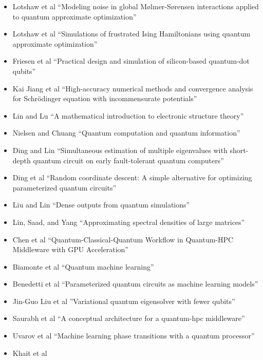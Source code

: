 \documentclass[]{article}
\begin{document}
\begin{itemize}
\item
Lotshaw et al\cite{PhysRevA.107.062406}
``Modeling noise in global M\o{}lmer-S\o{}rensen interactions applied to quantum approximate optimization''
\item
Lotshaw et al\cite{doi:10.1098/rsta.2021.0414}
``Simulations of frustrated Ising Hamiltonians using quantum approximate optimization''
\item Friesen et al\cite{PhysRevB.67.121301}
  ``Practical design and simulation of silicon-based quantum-dot qubits''
\item Kai Jiang et al\cite{jiang2024high}
``High-accuracy numerical methods and convergence analysis for Schr{\"o}dinger equation with incommensurate potentials''
\item Lin and Lu\cite{lin2019mathematical}
``A mathematical introduction to electronic structure theory''
\item Nielsen and Chuang\cite{nielsen2010quantum}
``Quantum computation and quantum information''
\item Ding and Lin\cite{ding2023simultaneous}
``Simultaneous estimation of multiple eigenvalues with short-depth quantum circuit on early fault-tolerant quantum computers''
\item Ding et al\cite{ding2024random}
  ``Random coordinate descent: A simple alternative for optimizing parameterized quantum circuits''
\item Liu and Lin\cite{LIU2024113213}
``Dense outputs from quantum simulations''
\item Lin, Saad, and Yang\cite{lin2016approximating}
``Approximating spectral densities of large matrices''
\item Chen et al\cite{10628380}
``Quantum-Classical-Quantum Workflow in Quantum-HPC Middleware with GPU Acceleration''
\item Biamonte et al\cite{biamonte2017quantum}
``Quantum machine learning''
\item Benedetti et al\cite{Benedetti_2019}
``Parameterized quantum circuits as machine learning models''
\item Jin-Guo Liu et al\cite{PhysRevResearch.1.023025}
''Variational quantum eigensolver with fewer qubits''
\item Saurabh et al\cite{saurabh2023conceptual}
``A conceptual architecture for a quantum-hpc middleware''
\item Uvarov et al\cite{uvarov2020machine}
``Machine learning phase transitions with a quantum processor''
\item Khait et al\cite{khait2023variational}

\end{itemize}
\end{document}
